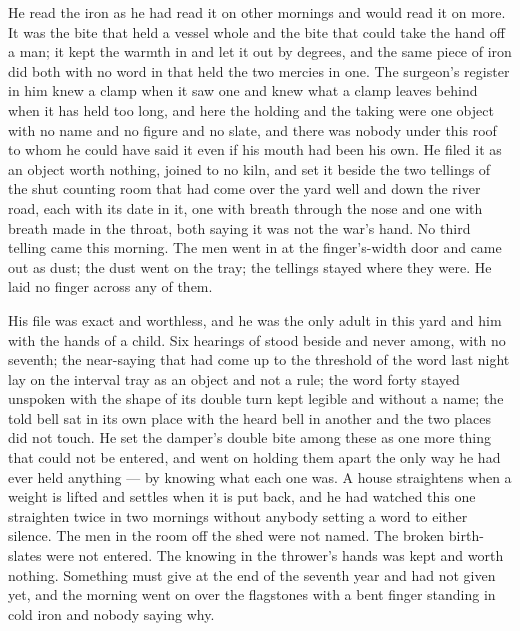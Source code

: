 He read the iron as he had read it on other mornings and would read it on more. It was the bite that held a vessel whole and the bite that could take the hand off a man; it kept the warmth in and let it out by degrees, and the same piece of iron did both with no word in  that held the two mercies in one. The surgeon's register in him knew a clamp when it saw one and knew what a clamp leaves behind when it has held too long, and here the holding and the taking were one object with no name and no figure and no slate, and there was nobody under this roof to whom he could have said it even if his mouth had been his own. He filed it as an object worth nothing, joined to no kiln, and set it beside the two tellings of the shut counting room that had come over the yard well and down the river road, each with its date in it, one with breath through the nose and one with breath made in the throat, both saying it was not the war's hand. No third telling came this morning. The men went in at the finger's-width door and came out as dust; the dust went on the tray; the tellings stayed where they were. He laid no finger across any of them.

His file was exact and worthless, and he was the only adult in this yard and him with the hands of a child. Six hearings of  stood beside and never among, with no seventh; the near-saying that had come up to the threshold of the word last night lay on the interval tray as an object and not a rule; the word forty stayed unspoken with the shape of its double turn kept legible and without a name; the told bell sat in its own place with the heard bell in another and the two places did not touch. He set the damper's double bite among these as one more thing that could not be entered, and went on holding them apart the only way he had ever held anything --- by knowing what each one was. A house straightens when a weight is lifted and settles when it is put back, and he had watched this one straighten twice in two mornings without anybody setting a word to either silence. The men in the room off the shed were not named. The broken birth-slates were not entered. The knowing in the thrower's hands was kept and worth nothing. Something must give at the end of the seventh year and had not given yet, and the morning went on over the flagstones with a bent finger standing in cold iron and nobody saying why.

